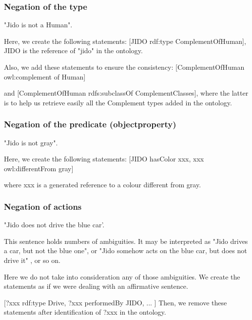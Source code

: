 \documentclass[twoside,a4paper,10pt]{report}
\begin{document}
\subsubsection{Negation of the type}

\small
\begin{verbatimtab}
  
  "Jido is not a Human".
  
  Here, we create the following statements:
  [JIDO rdf:type ComplementOfHuman], JIDO is the reference of "jido" in the ontology.
  
  Also, we add these statements to ensure the consistency:
  [ComplementOfHuman owl:complement of Human]
  
  and 
  [ComplementOfHuman rdfs:subclassOf ComplementClasses], where the latter is to help us retrieve
easily all the Complement types added in the ontology.
  
\end{verbatimtab}
\normalsize

\subsubsection{Negation of the predicate (object{\textunderscore}property)}

\small
\begin{verbatimtab}
  
  "Jido is not gray".
  
  Here, we create the following statements:
  [JIDO hasColor xxx,
  xxx owl:differentFrom gray]
  
  where xxx is a generated reference to a colour different from gray.
  
  
  
\end{verbatimtab}
\normalsize

\subsubsection{Negation of actions}

\small
\begin{verbatimtab}
  
  "Jido does not drive the blue car'.
  
  This sentence holds numbers of ambiguities. It may be interpreted as "Jido drives  a car, but not
the blue one", or 
  "Jido somehow acts on the blue car, but does not drive it" , or so on.
  
  Here we do not take into consideration any of those ambiguities. We create the statements as if we
were dealing with an
  affirmative sentence.
  
  [?xxx rdf:type Drive,
  ?xxx performedBy JIDO,
  ...
  ]
  Then, we remove these statements after identification of ?xxx in the ontology.
  
\end{verbatimtab}
\normalsize
\end{document}
